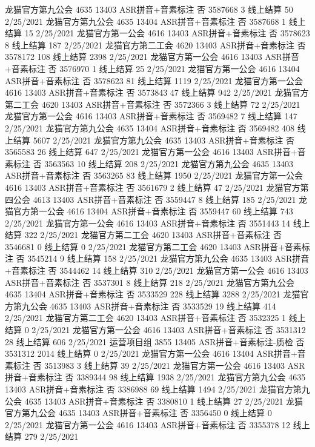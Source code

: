 龙猫官方第九公会	4635	13403	ASR拼音+音素标注	否	3587668	3	线上结算	50	2/25/2021
龙猫官方第九公会	4635	13404	ASR拼音+音素标注	否	3587668	1	线上结算	15	2/25/2021
龙猫官方第一公会	4616	13403	ASR拼音+音素标注	否	3578623	8	线上结算	187	2/25/2021
龙猫官方第二工会	4620	13403	ASR拼音+音素标注	否	3578172	108	线上结算	2398	2/25/2021
龙猫官方第一公会	4616	13403	ASR拼音+音素标注	否	3576970	1	线上结算	25	2/25/2021
龙猫官方第一公会	4616	13404	ASR拼音+音素标注	否	3578623	81	线上结算	1119	2/25/2021
龙猫官方第一公会	4616	13403	ASR拼音+音素标注	否	3573843	47	线上结算	942	2/25/2021
龙猫官方第二工会	4620	13403	ASR拼音+音素标注	否	3572366	3	线上结算	72	2/25/2021
龙猫官方第一公会	4616	13403	ASR拼音+音素标注	否	3569482	7	线上结算	147	2/25/2021
龙猫官方第九公会	4635	13404	ASR拼音+音素标注	否	3569482	408	线上结算	5607	2/25/2021
龙猫官方第九公会	4635	13403	ASR拼音+音素标注	否	3565583	26	线上结算	647	2/25/2021
龙猫官方第一公会	4616	13403	ASR拼音+音素标注	否	3563563	10	线上结算	208	2/25/2021
龙猫官方第九公会	4635	13403	ASR拼音+音素标注	否	3563265	83	线上结算	1950	2/25/2021
龙猫官方第一公会	4616	13403	ASR拼音+音素标注	否	3561679	2	线上结算	47	2/25/2021
龙猫官方第四公会	4613	13403	ASR拼音+音素标注	否	3559447	8	线上结算	185	2/25/2021
龙猫官方第一公会	4616	13404	ASR拼音+音素标注	否	3559447	60	线上结算	743	2/25/2021
龙猫官方第一公会	4616	13403	ASR拼音+音素标注	否	3551443	14	线上结算	322	2/25/2021
龙猫官方第二工会	4620	13403	ASR拼音+音素标注	否	3546681	0	线上结算	0	2/25/2021
龙猫官方第二工会	4620	13403	ASR拼音+音素标注	否	3545214	9	线上结算	158	2/25/2021
龙猫官方第九公会	4635	13403	ASR拼音+音素标注	否	3544462	14	线上结算	310	2/25/2021
龙猫官方第一公会	4616	13403	ASR拼音+音素标注	否	3537301	8	线上结算	218	2/25/2021
龙猫官方第九公会	4635	13404	ASR拼音+音素标注	否	3533529	228	线上结算	3288	2/25/2021
龙猫官方第九公会	4635	13403	ASR拼音+音素标注	否	3533529	19	线上结算	414	2/25/2021
龙猫官方第二工会	4620	13403	ASR拼音+音素标注	否	3532325	1	线上结算	0	2/25/2021
龙猫官方第一公会	4616	13403	ASR拼音+音素标注	否	3531312	28	线上结算	606	2/25/2021
运营项目组	3855	13405	ASR拼音+音素标注-质检	否	3531312	2014	线上结算	0	2/25/2021
龙猫官方第一公会	4616	13404	ASR拼音+音素标注	否	3513983	3	线上结算	39	2/25/2021
龙猫官方第一公会	4616	13403	ASR拼音+音素标注	否	3389344	98	线上结算	1938	2/25/2021
龙猫官方第九公会	4635	13403	ASR拼音+音素标注	否	3386988	69	线上结算	1494	2/25/2021
龙猫官方第九公会	4635	13403	ASR拼音+音素标注	否	3380810	1	线上结算	27	2/25/2021
龙猫官方第九公会	4635	13403	ASR拼音+音素标注	否	3356450	0	线上结算	0	2/25/2021
龙猫官方第一公会	4616	13403	ASR拼音+音素标注	否	3355378	12	线上结算	279	2/25/2021
